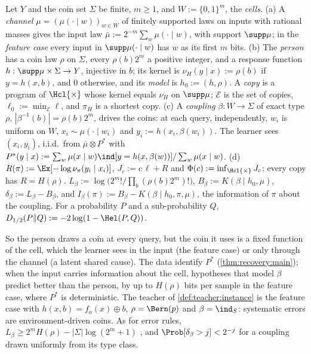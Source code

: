 \begin{definition}\label{def:imit:setting}
Let $Y$ and the coin set $\Sigma$ be finite, $m\ge1$, and $W:=\{0,1\}^m$, the \emph{cells}.
(a) A \emph{channel} $\mu=(\mu(\cdot\mid w))_{w\in W}$ of finitely supported laws on inputs with rational masses gives the input law $\bar\mu:=2^{-m}\sum_w\mu(\cdot\mid w)$, with support $\supp\mu$; in the \emph{feature case} every input in $\supp\mu(\cdot\mid w)$ has $w$ as its first $m$ bits.
(b) The \emph{person} has a coin law $\rho$ on $\Sigma$, every $\rho(b)2^m$ a positive integer, and a response function $h:\supp\mu\times\Sigma\to Y$, injective in $b$; its kernel is $\nu_H(y\mid x):=\rho(b)$ if $y=h(x,b)$, and $0$ otherwise, and its \emph{model} is $h_0:=(h,\rho)$. A \emph{copy} is a program of $\Hcl{\times}$ whose kernel equals $\nu_H$ on $\supp\mu$; $\mathcal E$ is the set of copies, $\ell_0:=\min_{\mathcal E}\ell$, and $\pi_H$ is a shortest copy.
(c) A \emph{coupling} $\beta:W\to\Sigma$ of exact type $\rho$, $|\beta^{-1}(b)|=\rho(b)2^m$, drives the coins: at each query, independently, $w_i$ is uniform on $W$, $x_i\sim\mu(\cdot\mid w_i)$ and $y_i:=h(x_i,\beta(w_i))$. The learner sees $(x_i,y_i)$, i.i.d.\ from $\bar\mu\otimes P^*$ with $P^*(y\mid x):=\sum_w\mu(x\mid w)\ind[y=h(x,\beta(w))]/\sum_w\mu(x\mid w)$.
(d) $R(\pi):=\Ex[-\log\nu_\pi(y_i\mid x_i)]$, $J_c:=c\,\ell+R$ and $\Phi(c):=\inf_{\Hcl{\times}}J_c$; every copy has $R=H(\rho)$. $L_\beta:=\log\big(2^m!/\prod_b(\rho(b)2^m)!\big)$, $B_\beta:=K(\beta\mid h_0,\mu)$, $\delta_\beta:=L_\beta-B_\beta$, and $I_\beta(\pi):=B_\beta-K(\beta\mid h_0,\pi,\mu)$, the information of $\pi$ about the coupling. For a probability $P$ and a sub-probability $Q$, $D_{1/2}(P\Vert Q):=-2\log(1-\Hel(P,Q))$.
\end{definition}

So the person draws a coin at every query, but the coin it uses is a fixed function of the cell, which the learner sees in the input (the feature case) or only through the channel (a latent shared cause). The data identify $P^*$ (\cref{thm:recovery:main}); when the input carries information about the cell, hypotheses that model $\beta$ predict better than the person, by up to $H(\rho)$ bits per sample in the feature case, where $P^*$ is deterministic. The teacher of \cref{def:teacher:instance} is the feature case with $h(x,b)=f_a(x)\oplus b$, $\rho=\Bern(p)$ and $\beta=\ind_S$: systematic errors are environment-driven coins. As for error rules, $L_\beta\ge2^mH(\rho)-|\Sigma|\log(2^m+1)$ \citep{cover2006elements}, and $\Prob[\delta_\beta>j]<2^{-j}$ for a coupling drawn uniformly from its type class.

